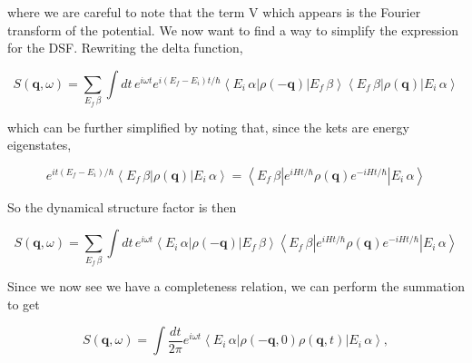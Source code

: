 \documentclass{article}
\begin{document}
			
			 where we are careful to note that the term V which appears is the Fourier transform of the potential. We now want to find a way to simplify the expression for the DSF. Rewriting the delta function,
			
			\begin{equation}
			S(\mathbf{q},\omega)=\sum_{E_f\,\beta}\int dt\,e^{i\omega t}e^{i(E_f-E_i)t/\hbar}\left<E_i\,\alpha\left|\rho(-\mathbf{q})\right|E_f\,\beta\right>\left<E_{f}\,\beta\left|\rho(\mathbf{q})\right|E_i\,\alpha\right>
			\end{equation}
			
			which can be further simplified by noting that, since the kets are energy eigenstates,
			
			\begin{equation}
			e^{it(E_f-E_i)/\hbar}\left<E_{f}\,\beta\left|\rho(\mathbf{q})\right|E_i\,\alpha\right>=\left<E_{f}\,\beta\left|e^{i Ht/\hbar}\rho(\mathbf{q})e^{-iHt/\hbar}\right|E_i\,\alpha\right>
			\end{equation}
			
			So the dynamical structure factor is then
			
			\begin{equation} \label{eq:double-sandwich}
			S(\mathbf{q},\omega)=\sum_{E_f\,\beta}\int dt\,e^{i\omega t} \left<E_i\,\alpha\left|\rho(-\mathbf{q})\right|E_f\,\beta\right> \left<E_{f}\,\beta\left|e^{i Ht/\hbar}\rho(\mathbf{q})e^{-iHt/\hbar}\right|E_i\,\alpha\right>  
			\end{equation}
			
			Since we now see we have a completeness relation, we can perform the summation to get
			
			
			\begin{equation} \label{eq:DSF}
			S(\mathbf{q},\omega)=\int \frac{dt}{2\pi}e^{i\omega t}\left<E_i\,\alpha\left|\rho(-\mathbf{q},0)\rho(\mathbf{q},t)\right|E_i\,\alpha\right>,
			\end{equation}
			
\end{document}
